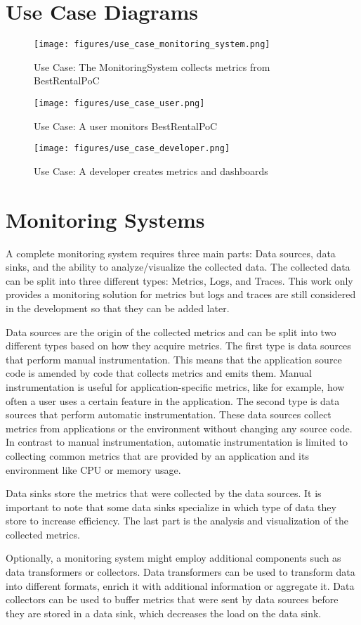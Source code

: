 \pagebreak
\section{Use Case Diagrams}

\begin{figure}[h]
	\centering
	\texttt{[image: figures/use\_case\_monitoring\_system.png]}
	\caption{Use Case: The MonitoringSystem collects metrics from BestRentalPoC}
	\label{fig:use_case_monitoring_system}
\end{figure}

\begin{figure}[h]
	\centering
	\texttt{[image: figures/use\_case\_user.png]}
	\caption{Use Case: A user monitors BestRentalPoC}
	\label{fig:use_case_user}
\end{figure}

\begin{figure}[h]
	\centering
	\texttt{[image: figures/use\_case\_developer.png]}
	\caption{Use Case: A developer creates metrics and dashboards}
	\label{fig:use_case_developer}
\end{figure}

\pagebreak
\section{Monitoring Systems}
A complete monitoring system requires three main parts: Data sources, data sinks, and the ability
to analyze/visualize the collected data. 
The collected data can be split into three different types: Metrics, Logs, and Traces.
This work only provides a monitoring solution for metrics but logs and traces are still considered
in the development so that they can be added later.

Data sources are the origin of the collected metrics and can be split into two different types
based on how they acquire metrics. The first type is data sources that perform manual instrumentation.
This means that the application source code is amended by code that collects metrics and emits them.
Manual instrumentation is useful for application-specific metrics, like for example, how often a user
uses a certain feature in the application.
The second type is data sources that perform automatic instrumentation.
These data sources collect metrics from applications or the environment without changing any source code.
In contrast to manual instrumentation, automatic instrumentation is limited to collecting
common metrics that are provided by an application and its environment like CPU or memory usage.

Data sinks store the metrics that were collected by the data sources.
It is important to note that some data sinks specialize in which type of data they store
to increase efficiency. The last part is the analysis and visualization of the collected metrics.

Optionally, a monitoring system might employ additional components such as data transformers or collectors.
Data transformers can be used to transform data into different formats, enrich it with additional information
or aggregate it.
Data collectors can be used to buffer metrics that were sent by data sources before they are stored in a data sink,
which decreases the load on the data sink.